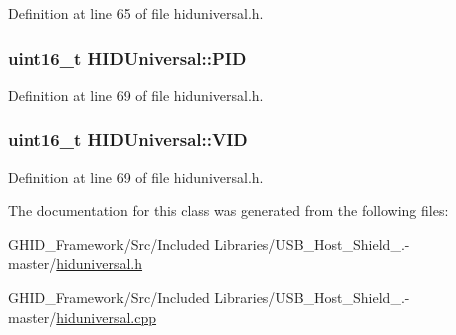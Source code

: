 \-Definition at line 65 of file hiduniversal.\-h.

\hypertarget{class_h_i_d_universal_abc609e49d66fa6260e7cdcd2c4ff0a5a}{
\subsubsection[{\-P\-I\-D}]{\setlength{\rightskip}{0pt plus 5cm}uint16\-\_\-t {\bf \-H\-I\-D\-Universal\-::\-P\-I\-D}}}\label{class_h_i_d_universal_abc609e49d66fa6260e7cdcd2c4ff0a5a}


\-Definition at line 69 of file hiduniversal.\-h.

\hypertarget{class_h_i_d_universal_a7f2123d1f20327600bb9e49a1ef5b0c7}{
\subsubsection[{\-V\-I\-D}]{\setlength{\rightskip}{0pt plus 5cm}uint16\-\_\-t {\bf \-H\-I\-D\-Universal\-::\-V\-I\-D}}}\label{class_h_i_d_universal_a7f2123d1f20327600bb9e49a1ef5b0c7}


\-Definition at line 69 of file hiduniversal.\-h.



\-The documentation for this class was generated from the following files\-:\begin{DoxyCompactItemize}
\item 
\-G\-H\-I\-D\-\_\-\-Framework/\-Src/\-Included Libraries/\-U\-S\-B\-\_\-\-Host\-\_\-\-Shield\-\_.-\/master/\hyperlink{hiduniversal_8h}{hiduniversal.\-h}\item 
\-G\-H\-I\-D\-\_\-\-Framework/\-Src/\-Included Libraries/\-U\-S\-B\-\_\-\-Host\-\_\-\-Shield\-\_.-\/master/\hyperlink{hiduniversal_8cpp}{hiduniversal.\-cpp}\end{DoxyCompactItemize}
